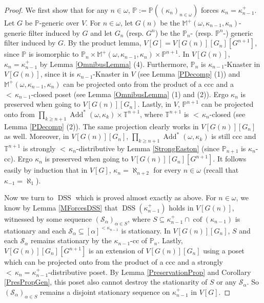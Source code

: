 \documentclass[12pt]{amsart}
\theoremstyle{definition}
\theoremstyle{remark}
\theoremstyle{plain}
\numberwithin{mydef}{section}
\DeclareMathOperator{\cof}{cof}
\DeclareMathOperator{\Add}{Add}
\DeclareMathOperator{\DSS}{DSS}
\newcommand{\dM}{\mathbb{M}}
\newcommand{\dP}{\mathbb{P}}
\newcommand{\dT}{\mathbb{T}}
\begin{document}
	\begin{proof}
		We first show that for any $n\in\omega$, $\dP:=\dP((\kappa_n)_{n\in\omega})$ forces $\kappa_n=\kappa_{n-1}^+$. Let $G$ be $\dP$-generic over $V$. For $n\in\omega$, let $G(n)$ be the $\dM^+(\omega,\kappa_{n-1},\kappa_n)$-generic filter induced by $G$ and let $G_n$ (resp. $G^n$) be the $\dP_n$- (resp. $\dP^n$-) generic filter induced by $G$. By the product lemma, $V[G]=V[G(n)][G_n][G^{n+1}]$, since $\dP$ is isomorphic to $\dP_n\times\dM^+(\omega,\kappa_{n-1},\kappa_n)\times\dP^{n+1}$. In $V[G(n)]$, $\kappa_n=\kappa_{n-1}^+$ by Lemma \ref{OmnibusLemma} (4). Furthermore, $\dP_n$ is $\kappa_{n-1}$-Knaster in $V[G(n)]$, since it is $\kappa_{n-1}$-Knaster in $V$ (see Lemma \ref{PDecomp} (1)) and $\dM^+(\omega,\kappa_{n-1},\kappa_n)$ can be projected onto from the product of a ccc and a ${<}\,\kappa_{n-1}$-closed poset (see Lemma \ref{OmnibusLemma} (1) and (2)). Ergo $\kappa_n$ is preserved when going to $V[G(n)][G_n]$. Lastly, in $V$, $\dP^{n+1}$ can be projected onto from $\prod_{k\geq n+1}\Add^*(\omega,\kappa_k)\times\dT^{n+1}$, where $\dT^{n+1}$ is ${<}\,\kappa_n$-closed (see Lemma \ref{PDecomp} (2)). The same projection clearly works in $V[G(n)][G_n]$ as well. Moreover, in $V[G(n)][G_n]$, $\prod_{k\geq n+1}\Add^*(\omega,\kappa_k)$ is still ccc and $\dT^{n+1}$ is strongly ${<}\,\kappa_n$-distributive by Lemma \ref{StrongEaston} (since $\dP_{n+1}$ is $\kappa_n$-cc). Ergo $\kappa_n$ is preserved when going to $V[G(n)][G_n][G^{n+1}]$. It follows easily by induction that in $V[G]$, $\kappa_n=\aleph_{n+2}$ for every $n\in\omega$ (recall that $\kappa_{-1}=\aleph_1$).
		
		Now we turn to $\DSS$ which is proved almost exactly as above. For $n\in\omega$, we know by Lemma \ref{MForcesDSS} that $\DSS(\kappa_{n-1}^+)$ holds in $V[G(n)]$, witnessed by some sequence $(\mathcal{S}_{\alpha})_{\alpha\in S}$, where $S\subseteq\kappa_{n-1}^+\cap\cof(\kappa_{n-1})$ is stationary and each $\mathcal{S}_{\alpha}\subseteq[\alpha]^{<\kappa_{n-1}}$ is stationary. In $V[G(n)][G_n]$, $S$ and each $\mathcal{S}_{\alpha}$ remains stationary by the $\kappa_{n-1}$-cc of $\dP_n$. Lastly, $V[G(n)][G_n][G^{n+1}]$ is an extension of $V[G(n)][G_n]$ using a poset which can be projected onto from the product of a ccc and a strongly ${<}\,\kappa_n=\kappa_{n-1}^+$-distributive poset. By Lemma \ref{PreservationProp} and Corollary \ref{PresPropGen}, this poset also cannot destroy the stationarity of $S$ or any $\mathcal{S}_{\alpha}$. So $(\mathcal{S}_{\alpha})_{\alpha\in S}$ remains a disjoint stationary sequence on $\kappa_{n-1}^+$ in $V[G]$.
	\end{proof}
	
\end{document}
